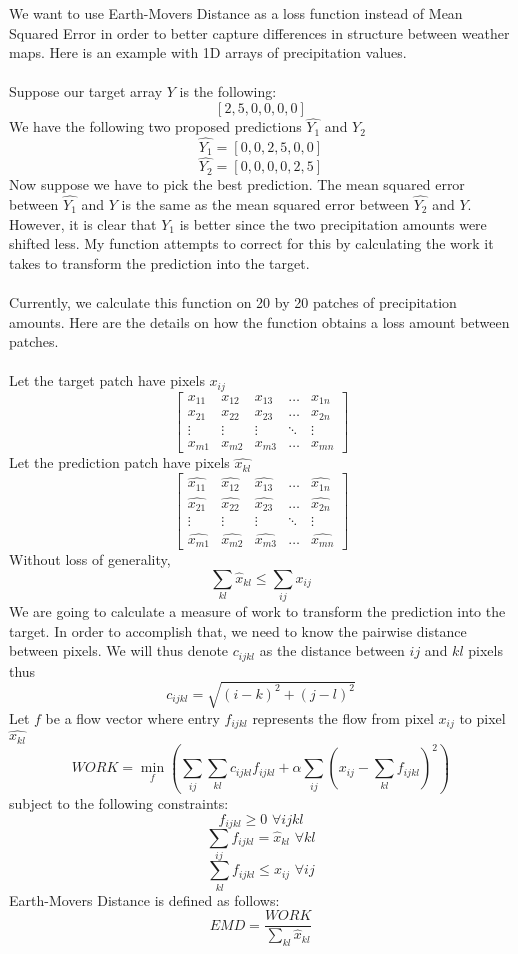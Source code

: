 \documentclass[twoside,11pt]{article}
\theoremstyle{definition}
\begin{document}
We want to use Earth-Movers Distance as a loss function instead of Mean Squared Error in order to better capture differences in structure between weather maps. Here is an example with 1D arrays of precipitation values. \\
\\
Suppose our target array $Y$ is the following:
\[
[2,5,0,0,0,0]
\]
We have the following two proposed predictions $\hat{Y_1}$ and $\hat{Y_2}$
\[
\hat{Y_1} =[0,0,2,5,0,0]
\]
\[
\hat{Y_2} = [0,0,0,0,2,5]
\]
Now suppose we have to pick the best prediction. The mean squared error between $\hat{Y_1}$ and $Y$ is the same as the mean squared error between  $\hat{Y_2}$ and $Y$. However, it is clear that $Y_1$ is better since the two precipitation amounts were shifted less. My function attempts to correct for this by calculating the work it takes to transform the prediction into the target. \\
\\
Currently, we calculate this function on 20 by 20 patches of precipitation amounts. Here are the details on how the function obtains a loss amount between patches.\\
\\
Let the target patch have pixels $x_{ij}$\\
\[
\begin{bmatrix}
    x_{11} & x_{12} & x_{13} & \dots  & x_{1n} \\
    x_{21} & x_{22} & x_{23} & \dots  & x_{2n} \\
    \vdots & \vdots & \vdots & \ddots & \vdots \\
    x_{m1} & x_{m2} & x_{m3} & \dots  & x_{mn}
\end{bmatrix}
\]
Let the prediction patch have pixels $\hat{x_{kl}}$\\
\[
\begin{bmatrix}
    \hat{x_{11}} & \hat{x_{12}} & \hat{x_{13}} & \dots  & \hat{x_{1n}} \\
    \hat{x_{21}} & \hat{x_{22}} & \hat{x_{23}} & \dots  & \hat{x_{2n}} \\
    \vdots & \vdots & \vdots & \ddots & \vdots \\
    \hat{x_{m1}} & \hat{x_{m2}} & \hat{x_{m3}} & \dots  & \hat{x_{mn}}
\end{bmatrix}
\]
Without loss of generality, 
\[
\sum_{kl}{\hat{x}_{kl}} \leq \sum_{ij}{x_{ij}}
\]
We are going to calculate a measure of work to transform the prediction into the target. In order to accomplish that, we need to know the pairwise distance between pixels. We will thus denote $c_{ijkl}$ as the distance between $ij$ and $kl$ pixels thus
\[
c_{ijkl} = \sqrt{(i-k)^2 + (j-l)^2}
\]
Let $f$ be a flow vector where entry $f_{ijkl}$ represents the flow from pixel $x_{ij}$ to pixel $\hat{x_{kl}}$\\
\[
WORK = \min_f(\sum_{ij}{\sum_{kl}{c_{ijkl} f_{ijkl}}} + \alpha \sum_{ij}{(x_{ij} - \sum_{kl}{f_{ijkl}})^2})
\]
subject to the following constraints:\\
\[
f_{ijkl} \geq 0 \, \, \forall ijkl
\]
\[
\sum_{ij}{f_{ijkl}} = \hat{x}_{kl} \, \, \forall kl
\]
\[
\sum_{kl}{f_{ijkl}} \leq x_{ij} \, \, \forall ij
\]
Earth-Movers Distance is defined as follows:
\[
EMD = \frac{WORK}{\sum_{kl}{\hat{x}_{kl}}}
\]
\end{document}
